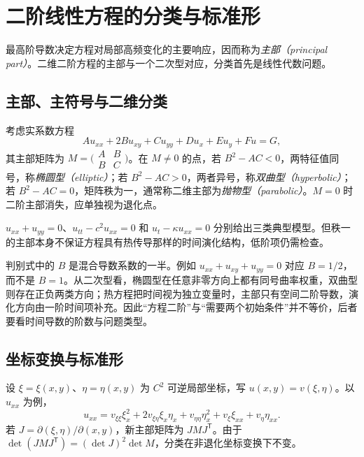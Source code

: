 \setcounter{chapter}{3} %
\chapter{二阶线性方程的分类与标准形}
\label{chap:classification}

最高阶导数决定方程对局部高频变化的主要响应，因而称为\emph{主部（principal part）}。二维二阶方程的主部与一个二次型对应，分类首先是线性代数问题。

\section{主部、主符号与二维分类}
考虑实系数方程
\begin{equation}
 A u_{xx}+2B u_{xy}+C u_{yy}+D u_x+E u_y+F u=G,
 \label{eq:second-order-general}
\end{equation}
其主部矩阵为 $M=\bigl(\begin{smallmatrix}A&B\\B&C\end{smallmatrix}\bigr)$。在 $M\ne0$ 的点，若 $B^2-AC<0$，两特征值同号，称\emph{椭圆型（elliptic）}；若 $B^2-AC>0$，两者异号，称\emph{双曲型（hyperbolic）}；若 $B^2-AC=0$，矩阵秩为一，通常称二维主部为\emph{抛物型（parabolic）}。$M=0$ 时二阶主部消失，应单独视为退化点。

$u_{xx}+u_{yy}=0$、$u_{tt}-c^2u_{xx}=0$ 和 $u_t-\kappa u_{xx}=0$ 分别给出三类典型模型。但秩一的主部本身不保证方程具有热传导那样的时间演化结构，低阶项仍需检查。

判别式中的 $B$ 是混合导数系数的一半。例如 $u_{xx}+u_{xy}+u_{yy}=0$ 对应 $B=1/2$，而不是 $B=1$。从二次型看，椭圆型在任意非零方向上都有同号曲率权重，双曲型则存在正负两类方向；热方程把时间视为独立变量时，主部只有空间二阶导数，演化方向由一阶时间项补充。因此“方程二阶”与“需要两个初始条件”并不等价，后者要看时间导数的阶数与问题类型。

\section{坐标变换与标准形}
设 $\xi=\xi(x,y)$、$\eta=\eta(x,y)$ 为 $C^2$ 可逆局部坐标，写 $u(x,y)=v(\xi,\eta)$。以 $u_{xx}$ 为例，
\[
 u_{xx}=v_{\xi\xi}\xi_x^2+2v_{\xi\eta}\xi_x\eta_x+v_{\eta\eta}\eta_x^2
         +v_\xi\xi_{xx}+v_\eta\eta_{xx}.
\]
若 $J=\partial(\xi,\eta)/\partial(x,y)$，新主部矩阵为 $JMJ^{\mathsf T}$。由于 $\det(JMJ^{\mathsf T})=(\det J)^2\det M$，分类在非退化坐标变换下不变。


